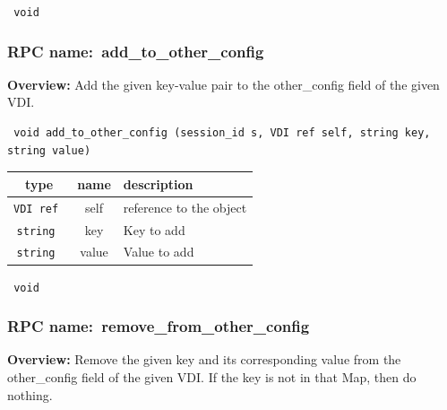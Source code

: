 \vspace{0.3cm}

{\tt 
void
}



\vspace{0.3cm}
\vspace{0.3cm}
\vspace{0.3cm}
\subsubsection{RPC name:~add\_to\_other\_config}

{\bf Overview:} 
Add the given key-value pair to the other\_config field of the given VDI.

\begin{verbatim} void add_to_other_config (session_id s, VDI ref self, string key, string value)\end{verbatim}



 
\vspace{0.3cm}
\begin{tabular}{|c|c|p{7cm}|}
 \hline
{\bf type} & {\bf name} & {\bf description} \\ \hline
{\tt VDI ref } & self & reference to the object \\ \hline 

{\tt string } & key & Key to add \\ \hline 

{\tt string } & value & Value to add \\ \hline 

\end{tabular}

\vspace{0.3cm}

{\tt 
void
}



\vspace{0.3cm}
\vspace{0.3cm}
\vspace{0.3cm}
\subsubsection{RPC name:~remove\_from\_other\_config}

{\bf Overview:} 
Remove the given key and its corresponding value from the other\_config
field of the given VDI.  If the key is not in that Map, then do nothing.

